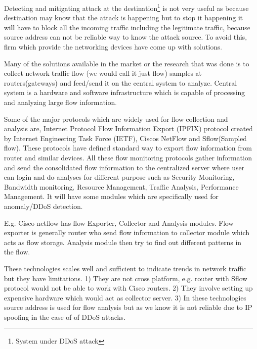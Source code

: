 \documentclass[10pt,oneside,a4paper]{article}
\begin{document}
Detecting and mitigating attack at the destination\footnote{System under DDoS attack} is not very useful as because destination may know that the attack is happening but to stop it happening it will have to block all the incoming traffic including the legitimate traffic, because source address can not be reliable way to know the attack source. To avoid this, firm which provide the networking devices have come up with solutions.

Many of the solutions available in the market or the research that was done is to collect network traffic flow\cite{networkTrafficFlow} (we would call it just flow) samples at routers(gateways) and feed/send it on the central system to analyze. Central system is a hardware and software infrastructure which is capable of processing and analyzing large flow information.\par

Some of the major protocols which are widely used for flow collection and analysis are, Internet Protocol Flow Information Export (IPFIX) protocol created by Internet Engineering Task Force (IETF), Ciscos NetFlow\cite{cisconetflow} and Sflow(Sampled flow)\cite{sflow}. These protocols have defined standard way to export flow information from router and similar devices. All these flow monitoring protocols gather information and send the consolidated flow information to the centralized server where user can login and do analyses for different purpose such as Security Monitoring, Bandwidth monitoring, Resource Management, Traffic Analysis, Performance Management. It will have some modules which are specifically used for anomaly/DDoS detection.\par

E.g. Cisco netflow has flow Exporter, Collector and Analysis modules. Flow exporter is generally router who send flow information to collector module which acts as flow storage. Analysis module then try to find out different patterns in the flow.\par

These technologies scales well and sufficient to indicate trends in network traffic but they have limitations. 1) They are not cross platform, e.g. router with Sflow protocol would not be able to work with Cisco routers. 2) They involve setting up expensive hardware which would act as collector server. 3) In these technologies source address is used for flow analysis but as we know it is not reliable due to IP spoofing in the case of of DDoS attacks.\par
\end{document}
